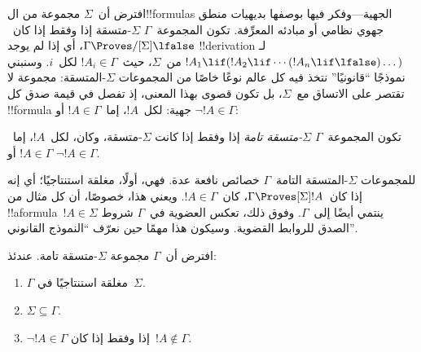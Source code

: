 \documentclass[../../../include/open-logic-section]{subfiles}
\begin{document}


افترض أن~$\Sigma$ مجموعة من ال!!{formula}s الجهية---وفكر فيها بوصفها
بديهيات منطق جهوي نظامي أو مبادئه المعرِّفة. تكون المجموعة~$\Gamma$
$\Sigma$-متسقة إذا وفقط إذا كان~$\Gamma \Proves/[\Sigma] \lfalse$،
أي إذا لم يوجد !!{derivation} لـ
$!A_1 \lif (!A_2 \lif \cdots (!A_n \lif \lfalse)\dots)$ من~$\Sigma$،
حيث~$!A_i \in \Gamma$ لكل~$i$. وسنبني نموذجًا ``قانونيًا'' نتخذ فيه
كل عالم نوعًا خاصًا من المجموعات $\Sigma$-المتسقة: مجموعة لا تقتصر
على الاتساق مع~$\Sigma$، بل تكون قصوى بهذا المعنى، إذ تفصل في قيمة
صدق كل !!{formula} جهية: لكل~$!A$، إما~$!A \in \Gamma$ أو
$\lnot !A \in \Gamma$:

\begin{defn}
  تكون المجموعة~$\Gamma$ \emph{$\Sigma$-متسقة تامة} إذا وفقط إذا
  كانت $\Sigma$-متسقة، وكان، لكل~$!A$، إما~$!A \in \Gamma$ أو
  $\lnot !A \in \Gamma$.
\end{defn}

للمجموعات $\Sigma$-المتسقة التامة~$\Gamma$ خصائص نافعة عدة. فهي،
أولًا، مغلقة استنتاجيًا؛ أي إنه إذا كان~$\Gamma \Proves[\Sigma] !A$،
كان~$!A \in \Gamma$. ويعني هذا، خصوصًا، أن كل مثال من
!!a{formula}~$!A \in \Sigma$ ينتمي أيضًا إلى~$\Gamma$. وفوق ذلك،
تعكس العضوية في~$\Gamma$ شروط الصدق للروابط القضوية. وسيكون هذا مهمًا
حين نعرّف ``النموذج القانوني''.

\begin{prop}
  افترض أن~$\Gamma$ مجموعة $\Sigma$-متسقة تامة. عندئذ:
  \begin{enumerate}
  \item {}%
    $\Gamma$ مغلقة استنتاجيًا في~$\Sigma$.
  \item {}%
    $\Sigma \subseteq \Gamma$.
  \item {}%
    $\lnot!A \in \Gamma$ إذا وفقط إذا كان~$!A \notin \Gamma$.
  \end{enumerate}
\end{prop}
\end{document}
